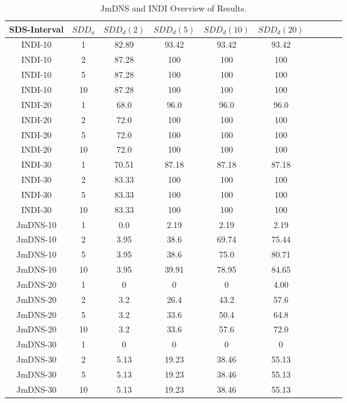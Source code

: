 \footnotesize
\begin{table}[h!]
\begin{center}
\begin{tabular}{| c | c | c | c | c | c | c | c | c | c |}
\hline
SDS-Interval & $SDD_{a}$ & $SDD_{d}(2)$ & $SDD_{d}(5)$ & $SDD_{d}(10)$ & $SDD_{d}(20)$  \\
\hline
INDI-10 & 1 & 82.89 & 93.42  & 93.42 & 93.42 \\
INDI-10 & 2 & 87.28 & 100  & 100 & 100 \\
INDI-10 & 5 & 87.28 & 100  & 100 & 100 \\
INDI-10 & 10 & 87.28 & 100  & 100 & 100 \\
\hline

INDI-20 & 1 & 68.0 & 96.0  & 96.0 & 96.0 \\
INDI-20 & 2 & 72.0 & 100  & 100 & 100 \\
INDI-20 & 5 & 72.0 & 100  & 100 & 100 \\
INDI-20 & 10 & 72.0 & 100  & 100 & 100 \\
\hline

INDI-30 & 1 & 70.51 & 87.18  & 87.18 & 87.18 \\
INDI-30 & 2 & 83.33 & 100  & 100 & 100 \\
INDI-30 & 5 & 83.33 & 100  & 100 & 100 \\
INDI-30 & 10 & 83.33 & 100  & 100 & 100 \\
\hline
\hline

JmDNS-10 & 1 & 0.0 & 2.19 & 2.19 & 2.19 \\
JmDNS-10 & 2 & 3.95 & 38.6  & 69.74 & 75.44 \\
JmDNS-10 & 5 & 3.95 & 38.6  & 75.0 & 80.71 \\
JmDNS-10 & 10 & 3.95 & 39.91 & 78.95 & 84.65 \\
\hline

JmDNS-20 & 1 & 0 & 0 & 0 & 4.00 \\
JmDNS-20 & 2 & 3.2 & 26.4  & 43.2 & 57.6 \\
JmDNS-20 & 5 & 3.2 & 33.6  & 50.4 & 64.8 \\
JmDNS-20 & 10 & 3.2 & 33.6 & 57.6 & 72.0 \\
\hline

JmDNS-30 & 1 & 0 & 0 & 0 & 0 \\
JmDNS-30 & 2 & 5.13 & 19.23  & 38.46 & 55.13 \\
JmDNS-30 & 5 & 5.13 & 19.23  & 38.46 & 55.13 \\
JmDNS-30 & 10 & 5.13 & 19.23  & 38.46 & 55.13 \\
\hline
\end{tabular}
\end{center}
\label{table:jmdns:comparison}
\caption{JmDNS and INDI Overview of Results.}
\end{table}
\normalsize